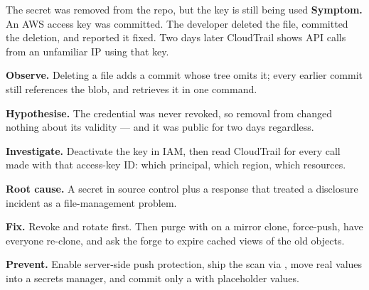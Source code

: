 \begin{debuglab}{The secret was removed from the repo, but the key is still being used}
\textbf{Symptom.} An AWS access key was committed. The developer deleted the file, committed the deletion, and reported it fixed. Two days later CloudTrail shows API calls from an unfamiliar IP using that key.


\begin{tickcheck}
  \item \textbf{Observe.} Deleting a file adds a commit whose tree omits it; every earlier commit still references the blob, and  retrieves it in one command.
  \item \textbf{Hypothesise.} The credential was never revoked, so removal from  changed nothing about its validity --- and it was public for two days regardless.
  \item \textbf{Investigate.} Deactivate the key in IAM, then read CloudTrail for every call made with that access-key ID: which principal, which region, which resources.
  \item \textbf{Root cause.} A secret in source control plus a response that treated a disclosure incident as a file-management problem.
  \item \textbf{Fix.} Revoke and rotate first. Then purge with  on a mirror clone, force-push, have everyone re-clone, and ask the forge to expire cached views of the old objects.
  \item \textbf{Prevent.} Enable server-side push protection, ship the  scan via , move real values into a secrets manager, and commit only a  with placeholder values.
\end{tickcheck}
\end{debuglab}


